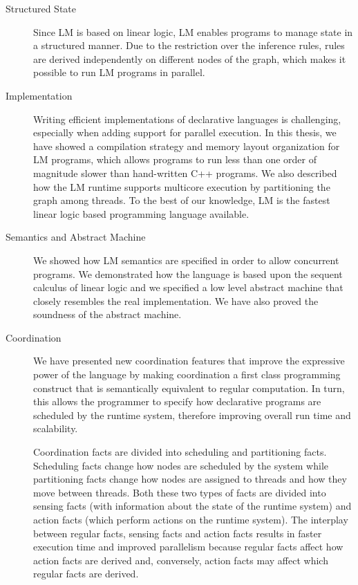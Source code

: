 \begin{description}
   \item[Structured State]

Since LM is based on linear logic, LM enables programs to manage
state in a structured manner. Due to the restriction over the inference rules,
rules are derived independently on different nodes of the graph, which makes it
possible to run LM programs in parallel.

   \item[Implementation]

Writing efficient implementations of declarative languages is challenging,
especially when adding support for parallel execution. In this thesis, we have
showed a compilation strategy and memory layout organization for LM programs,
which allows programs to run less than one order of magnitude slower than
hand-written C++ programs. We also described how the LM runtime supports
multicore execution by partitioning the graph among threads. To the best of our
knowledge, LM is the fastest linear logic based programming language available.

\item[Semantics and Abstract Machine]

We showed how LM semantics are specified in order to allow concurrent
programs. We demonstrated how the language is based upon the sequent calculus of
linear logic and we specified a low level abstract machine that closely
resembles the real implementation. We have also proved the soundness of the
abstract machine.

\item[Coordination]

We have presented new coordination features that improve the expressive
power of the language by making coordination a first class programming construct
that is semantically equivalent to regular computation. In turn, this allows the
programmer to specify how declarative programs are scheduled by the runtime
system, therefore improving overall run time and scalability.

Coordination facts are divided into scheduling and partitioning facts.
Scheduling facts change how nodes are scheduled by the system while partitioning
facts change how nodes are assigned to threads and how they move between
threads. Both these two types of facts are divided into sensing facts (with
information about the state of the runtime system) and action facts (which
perform actions on the runtime system). The interplay between regular facts,
sensing facts and action facts results in faster execution time and improved
parallelism because regular facts affect how action facts are derived and,
conversely, action facts may affect which regular facts are derived.


\end{description}
